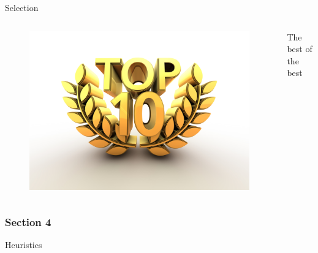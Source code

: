 \documentclass[24pt]{beamer}
\begin{document}
    \begin{frame}{Selection}
        \begin{columns}
                \begin{figure}
                \includegraphics[scale=0.145]{top10}
                \end{figure}
                The best of the best
        \end{columns}
    \end{frame}

    \begin{centering}
        \begin{frame}[c]{}
            \frametitle{Section 4}
            Heuristics
        \end{frame}
    \end{centering}
\end{document}
